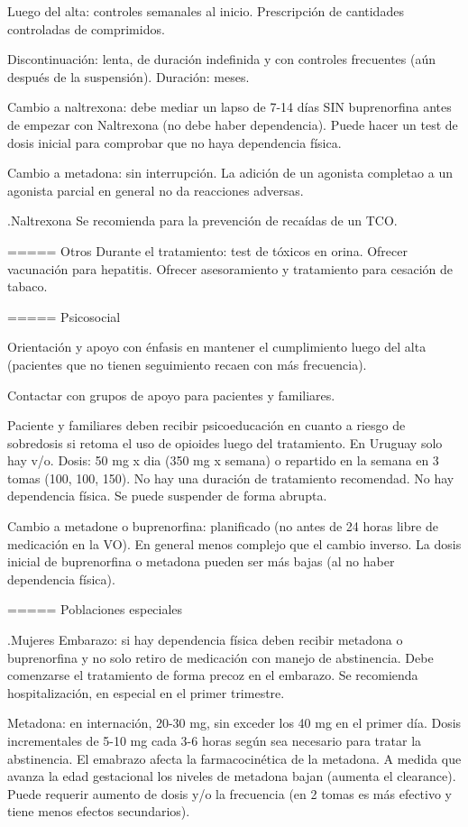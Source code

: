 Luego del alta: controles semanales al inicio. Prescripción de cantidades controladas de comprimidos.

Discontinuación: lenta, de duración indefinida y con controles frecuentes (aún después de la suspensión). Duración: meses.

Cambio a naltrexona: debe mediar un lapso de 7-14 días SIN buprenorfina antes de empezar con Naltrexona (no debe haber dependencia). Puede hacer un test de dosis inicial para comprobar que no haya dependencia física.

Cambio a metadona: sin interrupción. La adición de un agonista completao a un agonista parcial en general no da reacciones adversas.

.Naltrexona
Se recomienda para la prevención de recaídas de un TCO.

===== Otros
Durante el tratamiento: test de tóxicos en orina.
Ofrecer vacunación para hepatitis.
Ofrecer asesoramiento y tratamiento para cesación de tabaco.

===== Psicosocial

Orientación y apoyo con énfasis en mantener el cumplimiento luego del alta (pacientes que no tienen seguimiento recaen con más frecuencia).

Contactar con grupos de apoyo para pacientes y familiares.

Paciente y familiares deben recibir psicoeducación en cuanto a riesgo de sobredosis si retoma el uso de opioides luego del tratamiento. En Uruguay solo hay v/o.
Dosis: 50 mg x dia (350 mg x semana) o repartido en la semana en 3 tomas (100, 100, 150).
No hay una duración de tratamiento recomendad. No hay dependencia física. Se puede suspender de forma abrupta.

Cambio a metadone o buprenorfina: planificado (no antes de 24 horas libre de medicación en la VO). En general menos complejo que el cambio inverso. La dosis inicial de buprenorfina o metadona pueden ser más bajas (al no haber dependencia física).

===== Poblaciones especiales

.Mujeres
Embarazo: si hay dependencia física deben recibir metadona o buprenorfina y no solo retiro de medicación con manejo de abstinencia. Debe comenzarse el tratamiento de forma precoz en el embarazo. Se recomienda hospitalización, en especial en el primer trimestre.

Metadona: en internación, 20-30 mg, sin exceder los 40 mg en el primer día. Dosis incrementales de 5-10 mg cada 3-6 horas según sea necesario para tratar la abstinencia. El emabrazo afecta la farmacocinética de la metadona. A medida que avanza la edad gestacional los niveles de metadona bajan (aumenta el clearance). Puede requerir aumento de dosis y/o la frecuencia (en 2 tomas es más efectivo y tiene menos efectos secundarios).

